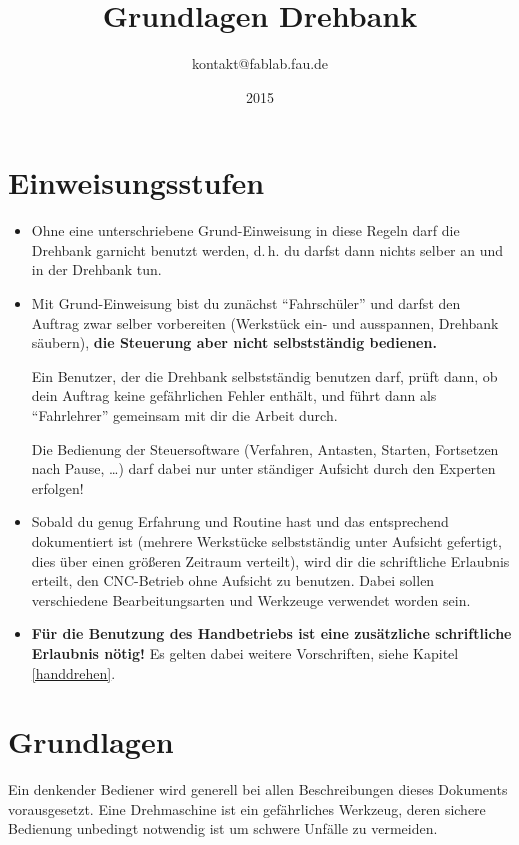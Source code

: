 \documentclass{\basedir/fablab-document}
\date{2015}
\author{kontakt@fablab.fau.de}
\title{Grundlagen Drehbank}
\begin{document}
\listoftodos

\tableofcontents

\newpage

\section{Einweisungsstufen}

\begin{itemize}
 \item Ohne eine unterschriebene Grund-Einweisung in diese Regeln darf die Drehbank garnicht benutzt werden, d.\,h. du darfst dann nichts selber an und in der Drehbank tun.
 \item Mit Grund-Einweisung bist du zunächst \enquote{Fahrschüler} und darfst den Auftrag zwar selber vorbereiten (Werkstück ein- und ausspannen, Drehbank säubern), \textbf{die Steuerung aber nicht selbstständig bedienen.} 

       Ein Benutzer, der die Drehbank selbstständig benutzen darf, prüft dann, ob dein Auftrag keine gefährlichen Fehler enthält, und führt dann als \enquote{Fahrlehrer} gemeinsam mit dir die Arbeit durch.

 Die Bedienung der Steuersoftware (Verfahren, Antasten, Starten, Fortsetzen nach Pause, \dots) darf dabei nur unter ständiger Aufsicht durch den Experten erfolgen!
 \item Sobald du genug Erfahrung und Routine hast und das entsprechend dokumentiert ist (mehrere Werkstücke selbstständig unter Aufsicht gefertigt, dies über einen größeren Zeitraum verteilt), wird dir die schriftliche Erlaubnis erteilt, den CNC-Betrieb ohne Aufsicht zu benutzen. Dabei sollen verschiedene Bearbeitungsarten und Werkzeuge verwendet worden sein.
 \item  \textbf{Für die Benutzung des Handbetriebs ist eine zusätzliche schriftliche Erlaubnis nötig!} Es gelten dabei weitere Vorschriften, siehe Kapitel \ref{handdrehen}.
\end{itemize}


\newpage
\section{Grundlagen}

Ein denkender Bediener wird generell bei allen Beschreibungen dieses Dokuments vorausgesetzt. Eine Drehmaschine ist ein gefährliches Werkzeug, deren sichere Bedienung unbedingt notwendig ist um schwere Unfälle zu vermeiden.
\end{document}
